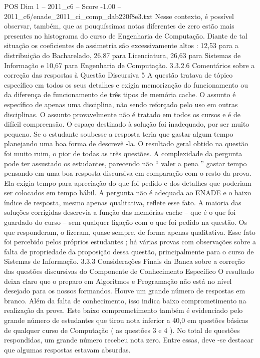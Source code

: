 \begin{textsample}{POS Dim 1 – 2011\_c6 – Score -1.00 – 2011\_c6/enade\_2011\_ci\_comp\_dab220f8e3.txt}
Nesse contexto, é possível observar, também, que as pouquíssimas notas diferentes de zero estão mais presentes no histograma do curso de Engenharia de Computação.
Diante de tal situação os coeficientes de assimetria são excessivamente altos : 12,53 para a distribuição do Bacharelado, 26,87 para Licenciatura, 26,63 para Sistemas de Informação e 10,67 para Engenharia de Computação. 3.3.2.6 Comentários sobre a correção das respostas à Questão Discursiva 5 A questão tratava de tópico específico em todos os seus detalhes e exigia memorização do funcionamento ou da diferença de funcionamento de três tipos de memória cache.
O assunto é específico de apenas uma disciplina, não sendo reforçado pelo uso em outras disciplinas.
O assunto provavelmente não é tratado em todos os cursos e é de difícil compreensão.
O espaço destinado à solução foi inadequado, por ser muito pequeno.
Se o estudante soubesse a resposta teria que gastar algum tempo planejando uma boa forma de descrevê -la.
O resultado geral obtido na questão foi muito ruim, o pior de todas as três questões.
A complexidade da pergunta pode ter assustado os estudantes, parecendo não “ valer a pena ” gastar tempo pensando em uma boa resposta discursiva em comparação com o resto da prova.
Ela exigia tempo para apreciação do que foi pedido e dos detalhes que poderiam ser colocados em tempo hábil.
A pergunta não é adequada ao ENADE e o baixo índice de resposta, mesmo apenas qualitativa, reflete esse fato.
A maioria das soluções corrigidas descrevia a função das memórias cache – que é o que foi guardado do curso – sem qualquer ligação com o que foi pedido na questão.
Os que responderam, o fizeram, quase sempre, de forma apenas qualitativa.
Esse fato foi percebido pelos próprios estudantes ; há várias provas com observações sobre a falta de propriedade da proposição dessa questão, principalmente para o curso de Sistemas de Informação. 3.3.3 Considerações Finais da Banca sobre a correção das questões discursivas do Componente de Conhecimento Específico O resultado deixa claro que o preparo em Algoritmos e Programação não está no nível desejado para os nossos formandos.
Houve um grande número de respostas em branco.
Além da falta de conhecimento, isso indica baixo comprometimento na realização da prova.
Este baixo comprometimento também é evidenciado pelo grande número de estudantes que tirou nota inferior a 40,0 em questões básicas de qualquer curso de Computação ( as questões 3 e 4 ).
No total de questões respondidas, um grande número recebeu nota zero.
Entre essas, deve -se destacar que algumas respostas estavam absurdas.

\end{textsample}
